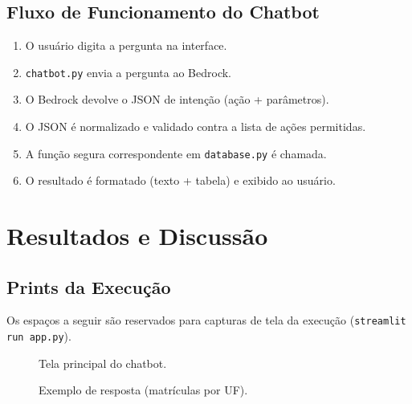 \documentclass[
    12pt,
    oneside,
    a4paper,
    chapter=TITLE,
    section=TITLE
]{abntex2}
\begin{document}
\section{Fluxo de Funcionamento do Chatbot}
\begin{enumerate}[itemsep=1pt]
  \item O usuário digita a pergunta na interface.
  \item \texttt{chatbot.py} envia a pergunta ao Bedrock.
  \item O Bedrock devolve o JSON de intenção (ação + parâmetros).
  \item O JSON é normalizado e validado contra a lista de ações permitidas.
  \item A função segura correspondente em \texttt{database.py} é chamada.
  \item O resultado é formatado (texto + tabela) e exibido ao usuário.
\end{enumerate}

\chapter{Resultados e Discussão}

\section{Prints da Execução}
Os espaços a seguir são reservados para capturas de tela da execução
(\texttt{streamlit run app.py}).

\begin{figure}[H]
\centering
\setlength{\fboxrule}{1pt}\setlength{\fboxsep}{5pt}
\caption{Tela principal do chatbot.}
\label{fig:tela}
\end{figure}

\begin{figure}[H]
\centering
\setlength{\fboxrule}{1pt}\setlength{\fboxsep}{5pt}
\caption{Exemplo de resposta (matrículas por UF).}
\label{fig:resp}
\end{figure}
\end{document}
